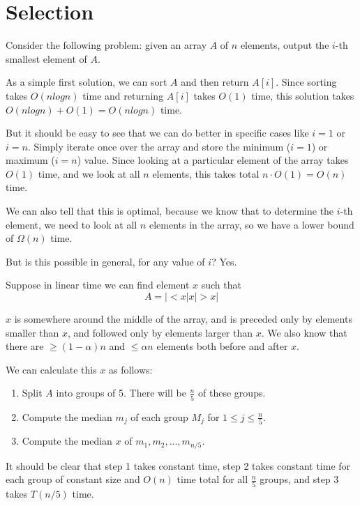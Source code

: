 \chapter{Selection}

Consider the following problem: given an array $A$ of $n$ elements,
output the $i$-th smallest element of $A$.

As a simple first solution, we can sort $A$ and then return $A[i]$.
Since sorting takes $O(nlogn)$ time and returning $A[i]$ takes $O(1)$
time, this solution takes $O(nlogn) + O(1) = O(nlogn)$ time.

But it should be easy to see that we can do better in specific cases
like $i=1$ or $i=n$.  Simply iterate once over the array and store the
minimum ($i=1$) or maximum ($i=n$) value.  Since looking at a
particular element of the array takes $O(1)$ time, and we look at all
$n$ elements, this takes total $n \cdot O(1) = O(n)$ time.

We can also tell that this is optimal, because we know that to
determine the $i$-th element, we need to look at all $n$ elements in
the array, so we have a lower bound of $\Omega (n)$ time.

But is this possible in general, for any value of $i$?  Yes.

Suppose in linear time we can find element $x$ such that
%
\begin{displaymath}
A = | < x | x | > x |
\end{displaymath}

$x$ is somewhere around the middle of the array, and is preceded only
by elements smaller than $x$, and followed only by elements larger
than $x$.  We also know that there are $ \geq (1-\alpha)n $ and $ \leq
\alpha n $ elements both before and after $x$.

We can calculate this $x$ as follows:

\begin{enumerate}

\item Split $A$ into groups of 5.  There will be $\frac{n}{5}$ of
  these groups.
\item Compute the median $m_j$ of each group $M_j$ for $ 1 \leq j \leq
  \frac{n}{5} $.
\item Compute the median $x$ of $m_1,m_2,...,m_{n/5}$.

\end{enumerate}

It should be clear that step 1 takes constant time, step 2 takes
constant time for each group of constant size and $O(n)$ time total
for all $\frac{n}{5}$ groups, and step 3 takes $T(n/5)$ time.

